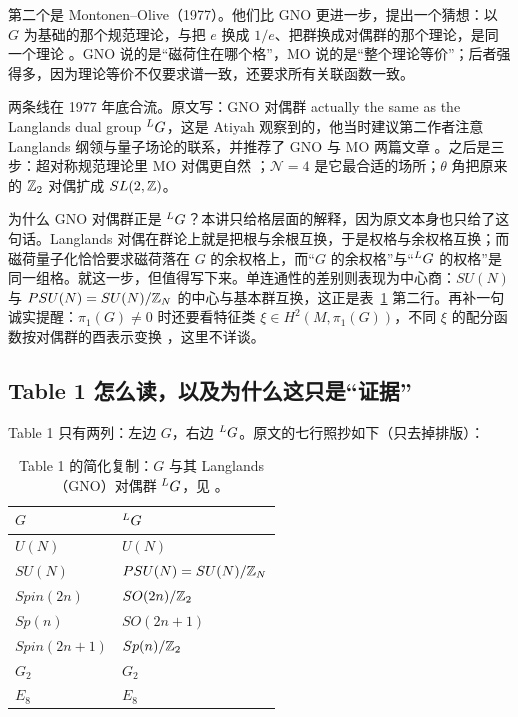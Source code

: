 第二个是 Montonen--Olive（1977）。他们比 GNO 更进一步，提出一个猜想：以 $G$ 为基础的那个规范理论，与把 $e$ 换成 $1/e$、把群换成对偶群的那个理论，是同一个理论 。GNO 说的是“磁荷住在哪个格”，MO 说的是“整个理论等价”；后者强得多，因为理论等价不仅要求谱一致，还要求所有关联函数一致。

两条线在 1977 年底合流。原文写：GNO 对偶群 actually the same as the Langlands dual group ${}^{L}G$，这是 Atiyah 观察到的，他当时建议第二作者注意 Langlands 纲领与量子场论的联系，并推荐了 GNO 与 MO 两篇文章 。之后是三步：超对称规范理论里 MO 对偶更自然 ；$\mathcal N=4$ 是它最合适的场所；$\theta$ 角把原来的 $\mathbb{Z}_2$ 对偶扩成 $SL(2,\mathbb{Z})$。

为什么 GNO 对偶群正是 ${}^{L}G$？本讲只给格层面的解释，因为原文本身也只给了这句话。Langlands 对偶在群论上就是把根与余根互换，于是权格与余权格互换；而磁荷量子化恰恰要求磁荷落在 $G$ 的余权格上，而“$G$ 的余权格”与“${}^{L}G$ 的权格”是同一组格。就这一步，但值得写下来。单连通性的差别则表现为中心商：$SU(N)$ 与 $PSU(N)=SU(N)/\mathbb{Z}_N$ 的中心与基本群互换，这正是表~\ref{tab:dual} 第二行。再补一句诚实提醒：$\pi_1(G)\neq0$ 时还要看特征类 $\xi\in H^2(M,\pi_1(G))$，不同 $\xi$ 的配分函数按对偶群的酉表示变换 ，这里不详谈。

\subsection{Table 1 怎么读，以及为什么这只是“证据”}

Table 1 只有两列：左边 $G$，右边 ${}^{L}G$。原文的七行照抄如下（只去掉排版）：

\begin{table}[htbp]
\centering
\small
\begin{tabular}{@{}ll@{}}
\toprule
$G$ & ${}^{L}G$ \\
\midrule
$U(N)$ & $U(N)$ \\
$SU(N)$ & $PSU(N)=SU(N)/\mathbb{Z}_N$ \\
$Spin(2n)$ & $SO(2n)/\mathbb{Z}_2$ \\
$Sp(n)$ & $SO(2n+1)$ \\
$Spin(2n+1)$ & $Sp(n)/\mathbb{Z}_2$ \\
$G_2$ & $G_2$ \\
$E_8$ & $E_8$ \\
\bottomrule
\end{tabular}
\caption{Table 1 的简化复制：$G$ 与其 Langlands（GNO）对偶群 ${}^{L}G$，见 。}
\label{tab:dual}
\end{table}

